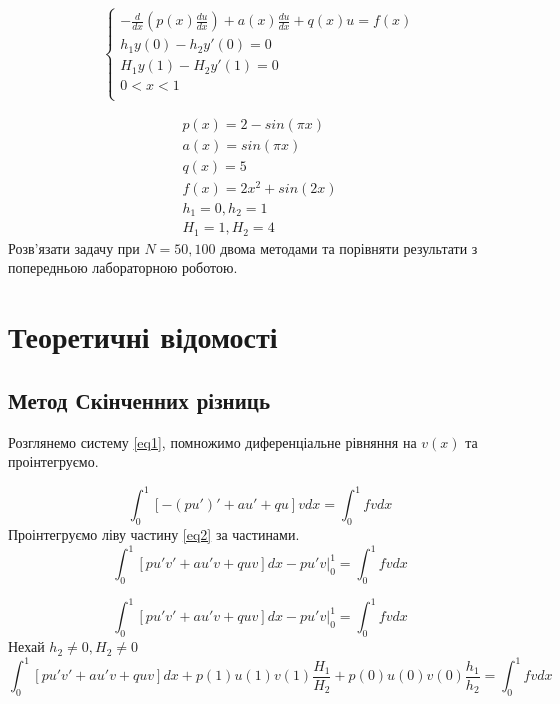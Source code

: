\documentclass[14pt,a4paper]{scrartcl}
\begin{document}
	
	\begin{equation}\label{eq1}
		\begin{cases}
			-\frac{d}{dx}(p(x)\frac{du}{dx})+a(x)\frac{du}{dx}+q(x)u=f(x)  \\ 
			h_1y(0) - h_2y'(0) =0 \\
			H_1y(1) - H_2y'(1) =0 \\
			0<x<1\\
		\end{cases}
	\end{equation}
	
	\begin{gather}
	p(x)= 2-sin(\pi x)\\
	a(x)= sin(\pi x)\\
	q(x)= 5\\
	f(x) = 2x^2 + sin(2x)\\
	h_1 = 0, h_2 = 1\\
	H_1= 1, H_2 = 4
	\end{gather}
	Розв'язати задачу при $N=50, 100$ двома методами та порівняти результати з попередньою лабораторною роботою.
	
	\section{Теоретичні відомості}
	\subsection{Метод Скінченних різниць}
	Розглянемо систему \ref{eq1}, помножимо диференціальне рівняння на $v(x)$ та проінтегруємо.
	
	\begin{equation} \label{eq2}
	\int_{0}^{1} \left[ -(p u')' + au' + qu\right]v dx = \int_{0}^{1} fv dx
	\end{equation}
	Проінтегруємо ліву частину \ref{eq2} за частинами.
	\begin{equation} \label{eq3}
	\int_{0}^{1} \left[ pu'v' + au'v + quv\right] dx - pu'v\big|_{0}^{1} = \int_{0}^{1} fv dx
	\end{equation}
	
	\begin{equation} \label{eq4}
	\int_{0}^{1} \left[ pu'v' + au'v + quv\right] dx - pu'v\big|_{0}^{1} = \int_{0}^{1} fv dx
	\end{equation}
	Нехай $h_2 \neq0, H_2 \neq0$
	\begin{equation} \label{eq5}
	\int_{0}^{1} \left[ pu'v' + au'v + quv\right] dx + p(1)u(1)v(1)\frac{H_1}{H_2} +p(0)u(0)v(0)\frac{h_1}{h_2} = \int_{0}^{1} fv dx
	\end{equation}
	
\end{document}

